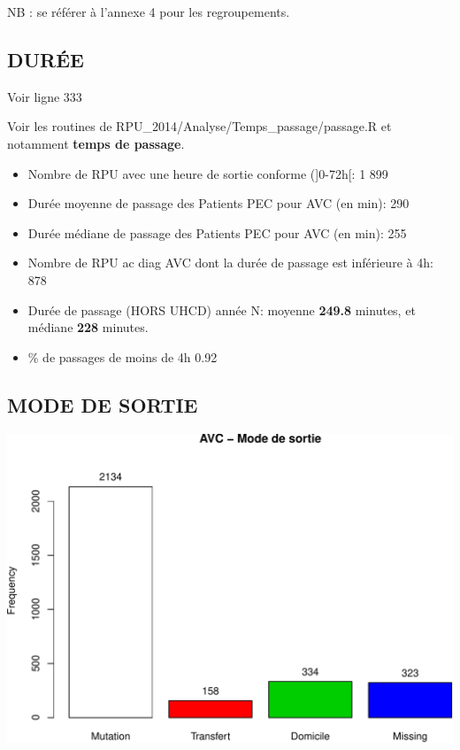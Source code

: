 \documentclass[]{article}
\begin{document}
NB : se référer à l'annexe 4 pour les regroupements.

\subsection{DURÉE}\label{duree-1}

Voir ligne 333

Voir les routines de RPU\_2014/Analyse/Temps\_passage/passage.R et
notamment \textbf{temps de passage}.

\begin{itemize}
\item
  Nombre de RPU avec une heure de sortie conforme ({]}0-72h{[}: 1 899
\item
  Durée moyenne de passage des Patients PEC pour AVC (en min): 290
\item
  Durée médiane de passage des Patients PEC pour AVC (en min): 255
\item
  Nombre de RPU ac diag AVC dont la durée de passage est inférieure à
  4h: 878
\item
  Durée de passage (HORS UHCD) année N: moyenne \textbf{249.8} minutes,
  et médiane \textbf{228} minutes.
\item
  \% de passages de moins de 4h 0.92
\end{itemize}

\subsection{MODE DE SORTIE}\label{mode-de-sortie-2}

\includegraphics{rapport2014_V4_files/figure-latex/avc_mode_sortie-1.pdf}
\end{document}
